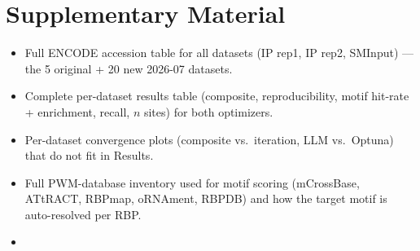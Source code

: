 \section{Supplementary Material}
\label{supplementary}


\begin{itemize}
  \item Full ENCODE accession table for all datasets (IP rep1, IP rep2, SMInput) — the 5 original + 20 new 2026-07 datasets.
  \item Complete per-dataset results table (composite, reproducibility, motif hit-rate + enrichment, recall, $n$ sites) for both optimizers.
  \item Per-dataset convergence plots (composite vs.\ iteration, LLM vs.\ Optuna) that do not fit in Results.
  \item Full PWM-database inventory used for motif scoring (mCrossBase, ATtRACT, RBPmap, oRNAment, RBPDB) and how the target motif is auto-resolved per RBP.
  \item {}
\end{itemize}
